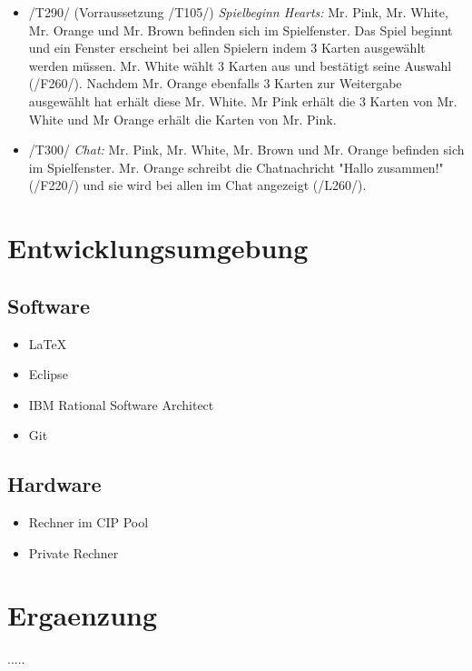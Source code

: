 \documentclass{article}
\begin{document}
\begin{itemize}
\begin{itemize}
		\item /T290/ (Vorraussetzung /T105/) \textit{Spielbeginn Hearts:} Mr. Pink, Mr. White, Mr. Orange und Mr. Brown befinden sich im Spielfenster. Das Spiel beginnt und ein Fenster erscheint bei allen Spielern indem 3 Karten ausgewählt werden müssen. Mr. White wählt 3 Karten aus und bestätigt seine Auswahl (/F260/). Nachdem Mr. Orange ebenfalls 3 Karten zur Weitergabe ausgewählt hat erhält diese Mr. White. Mr Pink erhält die 3 Karten von Mr. White und  Mr Orange erhält die Karten von Mr. Pink.
	
		\item /T300/ \textit{Chat:} Mr. Pink, Mr. White, Mr. Brown und Mr. Orange befinden sich im Spielfenster. Mr. Orange schreibt die Chatnachricht "Hallo zusammen!" (/F220/) und sie wird bei allen im Chat angezeigt (/L260/).
		
	\end{itemize}
\end{itemize}

\section{Entwicklungsumgebung}
\subsection{Software}
\begin{itemize}
	\item LaTeX
	\item Eclipse
	\item IBM Rational Software Architect
	\item Git
\end{itemize}

\subsection{Hardware}
\begin{itemize}
	\item Rechner im CIP Pool	
	\item Private Rechner
\end{itemize}

\section{Ergaenzung}
..... 
\end{document}
